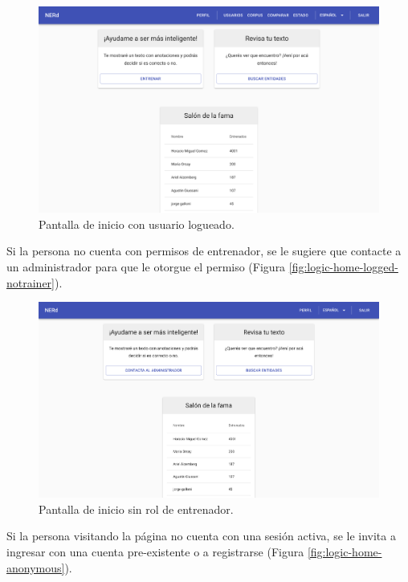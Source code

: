 \documentclass[12pt,a4paper,]{scrartcl}
\begin{document}
\begin{figure}[H]

{\centering \includegraphics{assets/logic/home-logged-all.pdf} 

}

\caption{Pantalla de inicio con usuario logueado.}\label{fig:logic-home}
\end{figure}

Si la persona no cuenta con permisos de entrenador, se le sugiere que contacte a un administrador para que le otorgue el permiso (Figura \ref{fig:logic-home-logged-notrainer}).

\begin{figure}[H]

{\centering \includegraphics{assets/logic/home-logged-not_trainer.pdf} 

}

\caption{Pantalla de inicio sin rol de entrenador.}\label{fig:logic-home-logged-nontrainer}
\end{figure}

Si la persona visitando la página no cuenta con una sesión activa, se le invita a ingresar con una cuenta pre-existente o a registrarse (Figura \ref{fig:logic-home-anonymous}).
\end{document}
